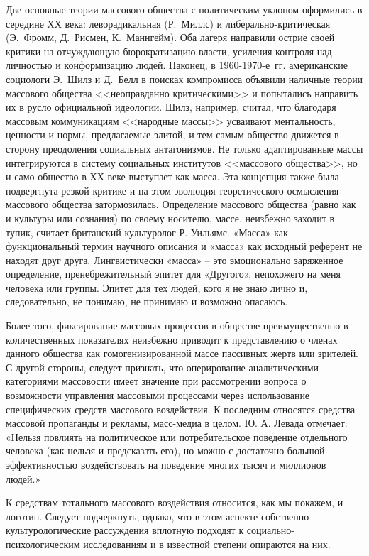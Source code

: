 Две основные теории массового общества
с политическим уклоном оформились в середине ХХ века: леворадикальная (Р.~Миллс)
и либерально-критическая (Э.~Фромм, Д.~Рисмен, К.~Маннгейм). Оба лагеря направили острие своей критики
на отчуждающую бюрократизацию власти, усиления контроля над личностью и конформизацию людей.
Наконец, в 1960-1970-е~гг. американские социологи Э.~Шилз и Д.~Белл в поисках компромисса объявили
наличные теории массового общества <<неоправданно критическими>> и попытались направить их в русло
официальной идеологии. Шилз, например, считал, что благодаря массовым коммуникациям <<народные массы>>
усваивают ментальность, ценности и нормы, предлагаемые элитой, и тем самым общество движется в сторону
преодоления социальных антагонизмов. Не только адаптированные массы интегрируются в систему
социальных институтов <<массового общества>>, но и само общество в ХХ веке выступает как масса.
Эта концепция также была подвергнута резкой критике и на этом эволюция теоретического осмысления массового
общества затормозилась. Определение массового общества (равно как и культуры или сознания) по своему носителю, массе, неизбежно заходит в тупик, считает британский культуролог Р.  Уильямс. «Масса» как функциональный термин научного описания и «масса» как исходный референт не находят друг друга. Лингвистически «масса» – это эмоционально заряженное определение, пренебрежительный эпитет для «Другого», непохожего на меня человека или группы. Эпитет для тех людей, кого я не знаю лично и, следовательно, не понимаю, не принимаю и возможно опасаюсь.\autocite{williams1985}\autocite{williams1989}\autocite{williams2006}

Более того, фиксирование массовых процессов в обществе преимущественно в количественных показателях неизбежно приводит к представлению о членах данного общества как гомогенизированной массе пассивных жертв или зрителей.\autocite{levada2001} С другой стороны, следует признать, что оперирование аналитическими категориями массовости   имеет значение при рассмотрении вопроса о возможности управления массовыми процессами через использование специфических средств массового воздействия. К последним относятся средства массовой пропаганды и рекламы, масс-медиа в целом. Ю. А. Левада отмечает: «Нельзя повлиять на политическое или потребительское поведение отдельного человека (как нельзя и предсказать его), но можно с достаточно большой эффективностью воздействовать на поведение многих тысяч и миллионов людей.»\autocite{levada2001} 

К средствам тотального массового воздействия относится, как мы покажем, и логотип. Следует подчеркнуть, однако, что в этом аспекте собственно культурологические рассуждения вплотную подходят к социально-психологическим исследованиям и в известной степени опираются на них.

